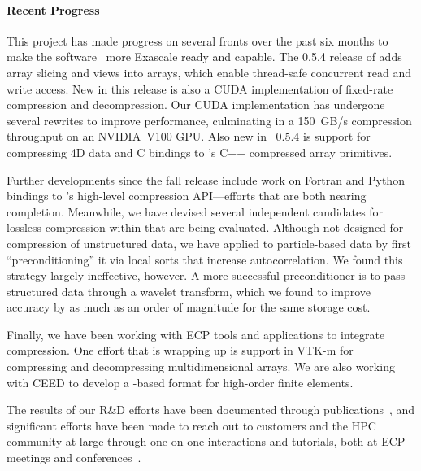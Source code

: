 \paragraph{Recent Progress}

This project has made progress on several fronts over the past six months to
make the {\zfp} software~\cite{zfp-code} more Exascale ready and capable.
The 0.5.4 release of {\zfp} adds array slicing and views into arrays,
which enable thread-safe concurrent read and write access.  New in this
release is also a CUDA implementation of fixed-rate compression and
decompression.  Our CUDA implementation has undergone several rewrites to
improve performance, culminating in a 150~GB/s compression throughput on an
NVIDIA~V100 GPU.  Also new in {\zfp}~0.5.4 is support for compressing 4D
data and C bindings to {\zfp}'s C++ compressed array primitives.

Further developments since the fall release include work on Fortran
and Python bindings to {\zfp}'s high-level compression API---efforts
that are both nearing completion.
Meanwhile, we have devised several independent candidates for lossless
compression within {\zfp} that are being evaluated.
Although not designed for compression of unstructured data, we have
applied {\zfp} to particle-based data
by first ``preconditioning'' it via local
sorts that increase autocorrelation.  We found this strategy largely
ineffective, however.
A more successful preconditioner is to pass structured data through
a wavelet transform, which we found to improve accuracy by as much as
an order of magnitude for the same storage cost.

Finally, we have been working with ECP tools and applications to integrate
{\zfp} compression.  One effort that is wrapping up is support in VTK-m for
compressing and decompressing multidimensional arrays.  We are also
working with CEED to develop a {\zfp}-based format for high-order
finite elements.

The results of our R\&D efforts have been documented through
publications~\cite{zfp-isc2017,zfp-jsm2017}, and significant efforts have
been made to reach out to customers and the HPC community at large through
one-on-one interactions and tutorials, both at ECP meetings and
conferences~\cite{zfp-isc2017-tut,zfp-sc2017-tut,zfp-ep2018-tut,zfp-sc2018-tut}.


